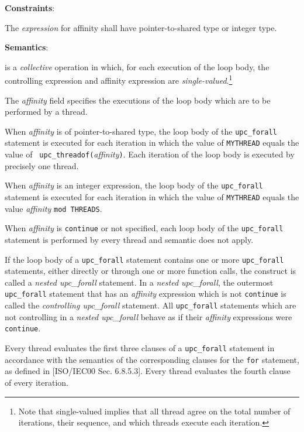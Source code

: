 {\bf Constraints}: 

\np The {\em expression} for affinity shall have pointer-to-shared
    type or integer type.

{\bf Semantics}: 

 is a {\em collective} operation in which, for each
    execution of the loop body, the controlling expression and
    affinity expression are {\em single-valued}.\footnote{Note that
    single-valued implies that all thread agree on the total number
    of iterations, their sequence, and which threads execute each
    iteration.}

\np The {\em affinity} field specifies the executions of the loop
    body which are to be performed by a thread.
    
\np When {\em affinity} is of pointer-to-shared type, the loop body of
    the {\tt upc\_forall} statement is executed for each iteration in
    which the value of {\tt MYTHREAD} equals the value of {\tt
    upc\_threadof(}{\em affinity}{\tt )}.  Each iteration of the  loop body is executed by
    precisely one thread.

\np When {\em affinity} is an integer expression, the loop body of
    the {\tt upc\_forall} statement is executed for each iteration in which
    the value of {\tt MYTHREAD} equals the value {\em affinity }{\tt mod THREADS}.

\np When {\em affinity} is {\tt continue} or not specified, each loop
    body of the {\tt upc\_forall} statement is performed by every thread and
    semantic  does not apply. 

\np If the loop body of a {\tt upc\_forall} statement
    contains one or more {\tt upc\_forall} statements, either directly
    or through one or more function calls, the construct is called a
    {\em nested upc\_forall} statement.  In a {\em nested upc\_forall},
    the outermost {\tt upc\_forall} statement that has an {\em
    affinity} expression which is not {\tt continue} is called the
    {\em controlling upc\_forall} statement.  All {\tt upc\_forall}
    statements which are not controlling in a {\em nested
    upc\_forall} behave as if their {\em affinity} expressions were
    {\tt continue}.

\np Every thread evaluates the first three clauses of a 
    {\tt upc\_forall} statement in accordance with the semantics of
    the corresponding clauses for the {\tt for} statement, as defined in
    [ISO/IEC00 Sec. 6.8.5.3].  Every thread evaluates the fourth
    clause of every iteration.

